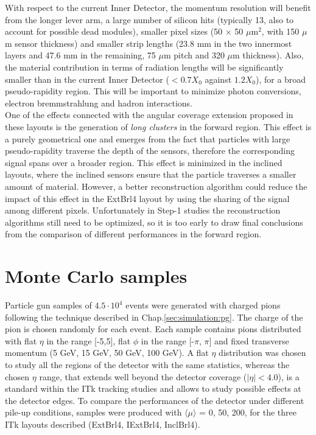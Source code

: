 \documentclass[a4paper,twoside,12pt]{book}
\begin{document}
With respect to the current Inner Detector, the momentum resolution will benefit from the longer lever arm, a large number of silicon hits (typically 13, also to account for
possible dead modules), smaller pixel sizes (50 $\times$ 50 $\mu$m$^2$, with 150 $\mu$m sensor thickness) and smaller strip lengths (23.8 mm in the two innermost
layers and 47.6 mm in the remaining, 75 $\mu$m pitch and 320 $\mu$m thickness)\cite{scoping}. Also, the material contribution in terms of radiation lengths 
will be significantly smaller than in the current Inner Detector ($< 0.7 X_{0}$ against $1.2 X_{0}$), for a broad pseudo-rapidity region. This will be important to minimize
photon conversions, electron bremmstrahlung and hadron interactions. \\

One of the effects connected with the angular coverage extension proposed in these layouts is the generation of \textit{long clusters} in the forward region. This effect is a purely 
geometrical one and emerges from the fact that particles with large pseudo-rapidity traverse the depth of the sensors, therefore the corresponding signal spans over a broader region. This effect is
minimized in the inclined layouts, where the inclined sensors ensure that the particle traverses a smaller amount of material. However, a better reconstruction algorithm could reduce
the impact of this effect in the ExtBrl4 layout by using the sharing 
of the signal among different pixels. Unfortunately in Step-1 studies the reconstruction algorithms still need to be optimized,
so it is too early to draw final conclusions from the comparison of different performances in the forward region. \\

\section{Monte Carlo samples}\label{sec:tracking:sampleProduction}
Particle gun samples of $4.5\cdot 10^4$ events were generated with charged pions following the technique described in Chap.\ref{sec:simulation:pg}. The charge of the pion
is chosen randomly for each event. 
Each sample contains pions distributed with flat $\eta$ in the range [-5,5], flat $\phi$ in the range [-$\pi$, $\pi$] and fixed transverse momentum (5 GeV, 15 GeV, 50 GeV, 100 GeV). 
A flat $\eta$ distribution was chosen to study all the regions of the detector with the same statistics, whereas the chosen $\eta$ range, that extends well beyond the detector coverage ($|\eta| < 4.0$),
is a standard within the ITk tracking studies and allows to study possible effects at the detector edges. 
To compare the performances of the detector under different pile-up conditions, samples were produced with $\langle\mu\rangle$ = 0, 50, 200, for the three ITk layouts described (ExtBrl4,
IExtBrl4, InclBrl4).
\end{document}
